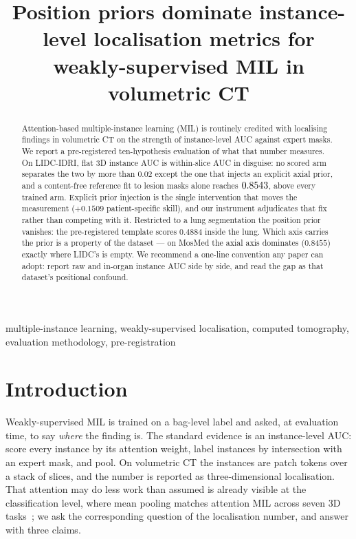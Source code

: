 \documentclass[conference]{IEEEtran}
\title{Position priors dominate instance-level localisation metrics for
weakly-supervised MIL in volumetric CT}
\author{\IEEEauthorblockN{Bhavesh Thapar}
\IEEEauthorblockA{University of Maryland, College Park\\
bthapar@terpmail.umd.edu}
\and
\IEEEauthorblockN{Mohammad Nayeem Teli}
\IEEEauthorblockA{University of Maryland, College Park\\
nayeem@umd.edu}}
\begin{document}
\maketitle

\begin{abstract}
Attention-based multiple-instance learning (MIL) is routinely credited with
localising findings in volumetric CT on the strength of instance-level AUC
against expert masks. We report a pre-registered ten-hypothesis evaluation of
what that number measures. On LIDC-IDRI, flat 3D instance AUC is within-slice
AUC in disguise: no scored arm separates the two by more than $0.02$ except
the one that injects an explicit axial prior, and a content-free reference fit
to lesion masks alone reaches $0.8543$, above every trained arm. Explicit
prior injection is the single intervention that moves the measurement
($+0.1509$ patient-specific skill), and our instrument adjudicates that fix
rather than competing with it. Restricted to a lung segmentation the position
prior vanishes: the pre-registered template scores $0.4884$ inside the lung.
Which axis carries the prior is a property of the dataset --- on MosMed the
axial axis dominates ($0.8455$) exactly where LIDC's is empty. We recommend a
one-line convention any paper can adopt: report raw and in-organ instance AUC
side by side, and read the gap as that dataset's positional confound.
\end{abstract}

\begin{IEEEkeywords}
multiple-instance learning, weakly-supervised localisation, computed
tomography, evaluation methodology, pre-registration
\end{IEEEkeywords}

\section{Introduction}

Weakly-supervised MIL is trained on a bag-level label and asked, at evaluation
time, to say \emph{where} the finding is. The standard evidence is an
instance-level AUC: score every instance by its attention weight, label
instances by intersection with an expert mask, and pool. On volumetric CT the
instances are patch tokens over a stack of slices, and the number is reported
as three-dimensional localisation. That attention may do less work than
assumed is already visible at the classification level, where mean pooling
matches attention MIL across seven 3D tasks~\citep{harvey2026benchmark}; we
ask the corresponding question of the localisation number, and answer with
three claims.
\end{document}
